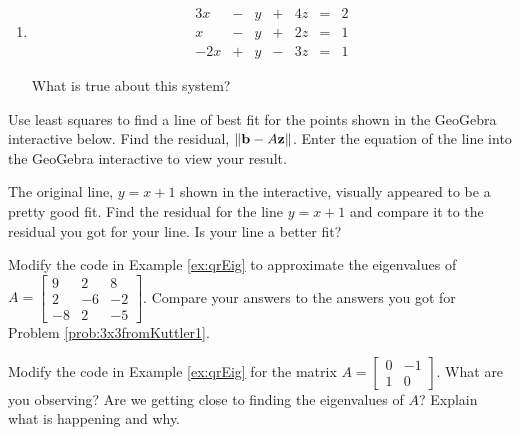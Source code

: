 \documentclass{ximera}
\begin{document}
\begin{problem}
\begin{enumerate}
    \item 
    \begin{equation}
\begin{array}{ccccccccc}
      3x &- &y&+&4z&= &2 \\
	 x&-&y&+&2z&=&1\\
     -2x&+&y&-&3z&=&1
    \end{array}
    \end{equation}

    What is true about this system?
    \begin{multipleChoice}
    \end{multipleChoice}

         \end{enumerate}
\end{problem}

\begin{problem}\label{prob_oct_lineFit}
  Use least squares to find a line of best fit for the points shown in the GeoGebra interactive below. Find the residual, $\left\lVert\mathbf{b}-A\mathbf{z}\right\rVert$.  
  Enter the equation of the line into the GeoGebra interactive to view your result.

  \begin{center}
  \end{center}
The original line, $y=x+1$ shown in the interactive, visually appeared to be a pretty good fit.  Find the residual for the line $y=x+1$ and compare it to the residual you got for your line.  Is your line a better fit?
\end{problem}

\begin{problem}\label{prob_oct_qr1}
Modify the code in Example \ref{ex:qrEig} to approximate the eigenvalues of $A=\begin{bmatrix} 9 & 2 & 8\\ 2 & -6 & -2\\ -8 & 2 & -5\end{bmatrix}$.  Compare your answers to the answers you got for Problem \ref{prob:3x3fromKuttler1}. 
\end{problem}

\begin{problem}\label{prob_oct_qr2}
  Modify the code in Example \ref{ex:qrEig} for the matrix $A=\begin{bmatrix} 0 & -1\\ 1 & 0 \end{bmatrix}$.  What are you observing?  Are we getting close to finding the eigenvalues of $A$?  Explain what is happening and why.
  \end{problem}
\end{document}
